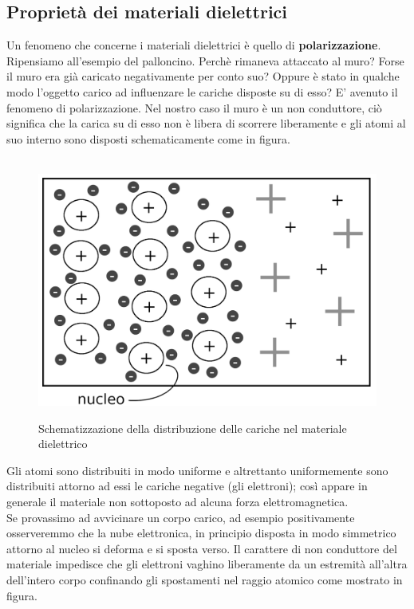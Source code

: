 \documentclass[11pt]{article}
\begin{document}
\subsection{Proprietà dei materiali dielettrici}
Un fenomeno che concerne i materiali dielettrici è quello di \textbf{polarizzazione}.\\Ripensiamo all'esempio del palloncino. Perchè rimaneva attaccato al muro? Forse il muro era già caricato negativamente per conto suo? Oppure è stato in qualche modo l'oggetto carico ad influenzare le cariche disposte su di esso?
E' avenuto il fenomeno di polarizzazione. Nel nostro caso il muro è un non conduttore, ciò significa che la carica su di esso non è libera di scorrere liberamente e gli atomi al suo interno sono disposti schematicamente come in figura.
\begin{center}
\begin{figure}[H]
			  \vspace{0pt}
              \hspace{-90pt}
              ~~~~~~~~~~~~~~~~~~~~~~~~~~~~~~~~~~~~~~~~~~~ \includegraphics[scale=0.21]{dielettrico}
               \caption{Schematizzazione della distribuzione delle cariche nel materiale dielettrico}
               \end{figure} 
               \end{center}
               Gli atomi sono distribuiti in modo uniforme e altrettanto uniformemente sono distribuiti attorno ad essi le cariche negative (gli elettroni); così appare in generale il materiale non sottoposto ad alcuna forza elettromagnetica.
\\Se provassimo ad avvicinare un corpo carico, ad esempio positivamente osserveremmo che la nube elettronica, in principio disposta in modo simmetrico attorno al nucleo si deforma e si sposta verso. Il carattere di non conduttore del materiale impedisce che gli elettroni vaghino liberamente da un estremità all'altra dell'intero corpo confinando gli spostamenti nel raggio atomico come mostrato in figura.
\end{document}
